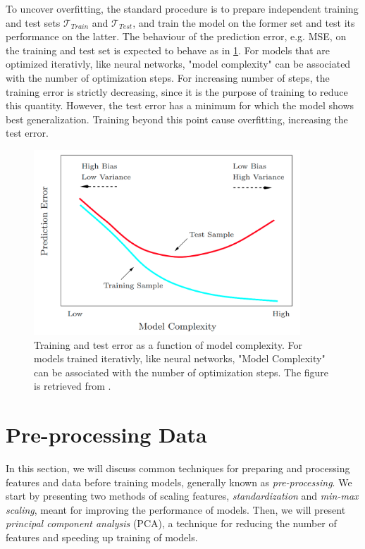 To uncover overfitting, the standard procedure is to prepare independent training and test sets $\mathcal{T}_{Train}$ and $\mathcal{T}_{Test}$, and train the model on the former set and test its performance on the latter. The behaviour of the prediction error, e.g. MSE, on the training and test set is expected to behave as in \cref{fig:train_test}. For models that are optimized iterativly, like neural networks, "model complexity" can be associated with the number of optimization steps. For increasing number of steps, the training error is strictly decreasing, since it is the purpose of training to reduce this quantity. However, the test error has a minimum for which the model shows best generalization. Training beyond this point cause overfitting, increasing the test error. 

\begin{figure}[H]
    \centering
    \includegraphics[width=10cm]{latex/figures/train_test.png}
    \caption{Training and test error as a function of model complexity. For models trained iterativly, like neural networks, "Model Complexity" can be associated with the number of optimization steps. The figure is retrieved from \citet{hastie01statisticallearning}.}
    \label{fig:train_test}
\end{figure}


\section{Pre-processing Data}\label{sec:Pre-processing Features Theory}
In this section, we will discuss common techniques for preparing and processing features and data before training models, generally known as \emph{pre-processing}. We start by presenting two methods of scaling features, \emph{standardization} and \emph{min-max scaling}, meant for improving the performance of models. Then, we will present \emph{principal component analysis} (PCA), a technique for reducing the number of features and speeding up training of models. 

